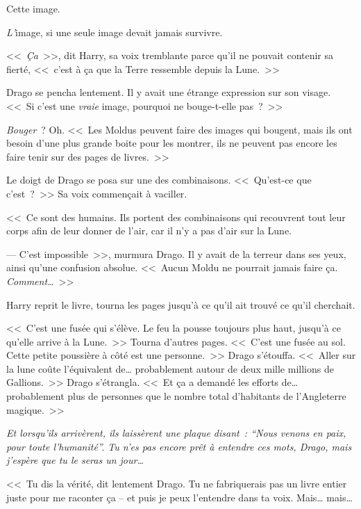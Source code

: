 Cette image.

\emph{L'}image, si une seule image devait jamais survivre.

<<~\emph{Ça}~>>, dit Harry, sa voix tremblante parce qu'il ne pouvait contenir sa fierté, <<~c'est à ça que la Terre ressemble depuis la Lune.~>>

Drago se pencha lentement. Il y avait une étrange expression sur son visage. <<~Si c'est une \emph{vraie} image, pourquoi ne bouge-t-elle pas~?~>>

\emph{Bouger}~? Oh. <<~Les Moldus peuvent faire des images qui bougent, mais ils ont besoin d'une plus grande boite pour les montrer, ils ne peuvent pas encore les faire tenir sur des pages de livres.~>>

Le doigt de Drago se posa sur une des combinaisons. <<~Qu'est-ce que c'est~?~>> Sa voix commençait à vaciller.

<<~Ce sont des humains. Ils portent des combinaisons qui recouvrent tout leur corps afin de leur donner de l'air, car il n'y a pas d'air sur la Lune.

--- C'est impossible~>>, murmura Drago. Il y avait de la terreur dans ses yeux, ainsi qu'une confusion absolue. <<~Aucun Moldu ne pourrait jamais faire ça. \emph{Comment…}~>>

Harry reprit le livre, tourna les pages jusqu'à ce qu'il ait trouvé ce qu'il cherchait.

<<~C'est une fusée qui s'élève. Le feu la pousse toujours plus haut, jusqu'à ce qu'elle arrive à la Lune.~>> Tourna d'autres pages. <<~C'est une fusée au sol. Cette petite poussière à côté est une personne.~>> Drago s'étouffa. <<~Aller sur la lune coûte l'équivalent de… probablement autour de deux mille millions de Gallions.~>> Drago s'étrangla. <<~Et ça a demandé les efforts de… probablement plus de personnes que le nombre total d'habitants de l'Angleterre magique.~>>

\emph{Et lorsqu'ils arrivèrent, ils laissèrent une plaque disant~: “Nous venons en paix, pour toute l'humanité”. Tu n'es pas encore prêt à entendre ces mots, Drago, mais j'espère que tu le seras un jour…}

<<~Tu dis la vérité, dit lentement Drago. Tu ne fabriquerais pas un livre entier juste pour me raconter ça -- et puis je peux l'entendre dans ta voix. Mais… mais…


